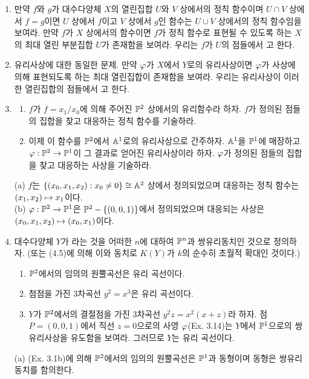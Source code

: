 	\begin{enumerate}[label=\tb{4.\arabic*.},itemindent=0mm,itemsep=4mm]
		\item 만약 $f$와 $g$가 대수다양체 $X$의 열린집합 $U$와 $V$ 상에서의 정칙 함수이며 $U\cap V$ 상에서 $f=g$이면
		$U$ 상에서 $f$이고 $V$ 상에서 $g$인 함수는 $U\cup V$ 상에서의 정칙 함수임을 보여라.
		만약 $f$가 $X$ 상에서의 함수이면 $f$가 정칙 함수로 표현될 수 있도록 하는 $X$의 최대 열린 부분집합 $U$가 존재함을 보여라.
		우리는 $f$가 $U$의 점들에서 고 한다.
		\item 유리사상에 대한 동일한 문제. 만약 $\varphi$가 $X$에서 $Y$로의 유리사상이면 $\varphi$가 사상에 의해 표현되도록 하는
		최대 열린집합이 존재함을 보여라. 우리는 유리사상이 이러한 열린집합의 점들에서 고 한다.
		\item \begin{enumerate}[label=(\alph*)]
			\item $f$가 $f=x_1/x_0$에 의해 주어진 $\mathbb{P}^2$ 상에서의 유리함수라 하자.
			$f$가 정의된 점들의 집합을 찾고 대응하는 정칙 함수를 기술하라.
			\item 이제 이 함수를 $\mathbb{P}^2$에서 $\mathbb{A}^1$로의 유리사상으로 간주하자. $\mathbb{A}^1$을 $\mathbb{P}^1$에 매장하고
			$\varphi:\mathbb{P}^2\rightarrow\mathbb{P}^1$이 그 결과로 얻어진 유리사상이라 하자. $\varphi$가 정의된 점들의 집합을 찾고 대응하는 사상을 기술하라.
		\end{enumerate}
		\sol (a) $f$는 $\{(x_0,x_1,x_2):x_0\ne 0\}\cong\mathbb{A}^2$ 상에서 정의되었으며
		대응하는 정칙 함수는 $(x_1,x_2)\mapsto x_1$이다.\\
		(b) $\varphi:\mathbb{P}^2\rightarrow\mathbb{P}^1$은 $\mathbb{P}^2-\{(0,0,1)\}$에서 정의되었으며 대응되는 사상은 $(x_0,x_1,x_2)\mapsto(x_0,x_1)$이다.
		\item 대수다양체 $Y$가 라는 것을 어떠한 $n$에 대하여 $\mathbb{P}^n$과 쌍유리동치인 것으로 정의하자.
		(또는 (4.5)에 의해 이와 동치로 $K(Y)$가 $k$의 순수히 초월적 확대인 것이다.)
		\begin{enumerate}[label=(\alph*)]
		\item $\mathbb{P}^2$에서의 임의의 원뿔곡선은 유리 곡선이다.
		\item 첨점을 가진 3차곡선 $y^2=x^3$은 유리 곡선이다.
		\item $Y$가 $\mathbb{P}^2$에서의 결절점을 가진 3차곡선 $y^2z=x^2(x+z)$라 하자.
		점 $P=(0,0,1)$에서 직선 $z=0$으로의 사영 $\varphi$(Ex. 3.14)는 $Y$에서 $\mathbb{P}^1$으로의 쌍유리사상을 유도함을 보여라.
		그러므로 $Y$는 유리 곡선이다.
		\end{enumerate}
		\sol (a) (Ex. 3.1b)에 의해 $\mathbb{P}^2$에서의 임의의 원뿔곡선은 $\mathbb{P}^1$과 동형이며 동형은 쌍유리동치를 함의한다.\\

\end{enumerate}
